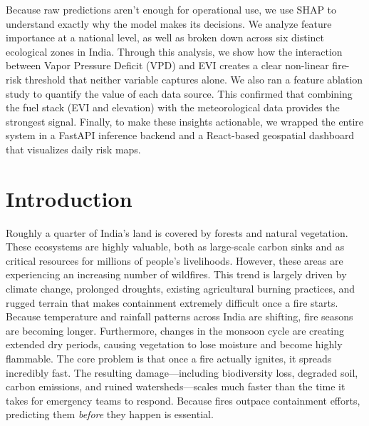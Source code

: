 \documentclass[11pt]{article}
\begin{document}
Because raw predictions aren't enough for operational use, we use SHAP to understand exactly why the model makes its decisions. We analyze feature importance at a national level, as well as broken down across six distinct ecological zones in India. Through this analysis, we show how the interaction between Vapor Pressure Deficit (VPD) and EVI creates a clear non-linear fire-risk threshold that neither variable captures alone. We also ran a feature ablation study to quantify the value of each data source. This confirmed that combining the fuel stack (EVI and elevation) with the meteorological data provides the strongest signal. Finally, to make these insights actionable, we wrapped the entire system in a FastAPI inference backend and a React-based geospatial dashboard that visualizes daily risk maps.

\section*{Introduction}

Roughly a quarter of India's land is covered by forests and natural vegetation. These ecosystems are highly valuable, both as large-scale carbon sinks and as critical resources for millions of people's livelihoods. However, these areas are experiencing an increasing number of wildfires. This trend is largely driven by climate change, prolonged droughts, existing agricultural burning practices, and rugged terrain that makes containment extremely difficult once a fire starts. Because temperature and rainfall patterns across India are shifting, fire seasons are becoming longer. Furthermore, changes in the monsoon cycle are creating extended dry periods, causing vegetation to lose moisture and become highly flammable. The core problem is that once a fire actually ignites, it spreads incredibly fast. The resulting damage—including biodiversity loss, degraded soil, carbon emissions, and ruined watersheds—scales much faster than the time it takes for emergency teams to respond. Because fires outpace containment efforts, predicting them \textit{before} they happen is essential.
\end{document}
